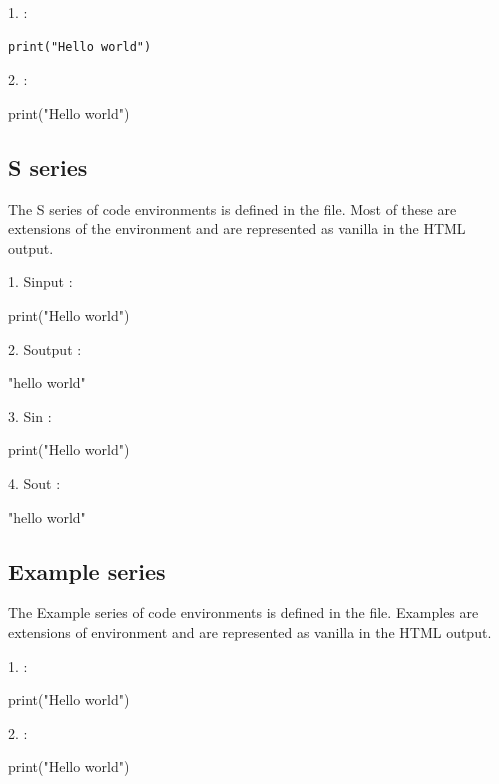 1.  :

\begin{verbatim}
print("Hello world")
\end{verbatim}


2.  :

\begin{boxedverbatim}
print("Hello world")
\end{boxedverbatim}


\subsection{S series}

The S series of code environments is defined in the  file. Most of these are
extensions of the  environment and are represented as vanilla  in the HTML output.

1. Sinput :

\begin{Sinput}
print("Hello world")
\end{Sinput}


2. Soutput :

\begin{Soutput}
[1] "hello world"
\end{Soutput}


3. Sin :

\begin{Sin}
print("Hello world")
\end{Sin}


4. Sout :
\begin{Sout}
[1] "hello world"
\end{Sout}


\subsection{Example series}

The Example series of code environments is defined in the  file. Examples are
extensions of  environment and are represented as vanilla  in the HTML output.

1.  :

\begin{example}
print("Hello world")
\end{example}


2.  :

\begin{example*}
print("Hello world")
\end{example*}


